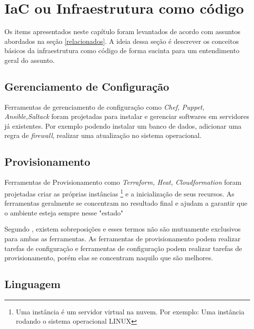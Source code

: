 \section{\esp IaC ou Infraestrutura como código} \label{IaC}

Os items apresentados neste capítulo foram levantados de acordo com assuntos abordados na seção \ref{relacionados}. A ideia dessa seção é descrever os conceitos básicos da infraestrutura como código de forma sucinta para um entendimento geral do assunto.  

\subsection{Gerenciamento de Configuração} 
Ferramentas de gerenciamento de configuração como \textit{Chef, Puppet, Ansible,Saltack} foram projetadas para instalar e gerenciar softwares em servidores já existentes. Por exemplo podendo instalar um banco de dados, adicionar uma regra de \textit{firewall}, realizar uma atualização no sistema operacional. 

\subsection{Provisionamento}

Ferramentas de Provisionamento como \textit{Terraform, Heat, Cloudformation} foram projetadas criar as próprias instâncias \footnote{Uma instância é um servidor virtual na nuvem. Por exemplo: Uma instância rodando o sistema operacional LINUX} e a inicialização de seus recursos. As ferramentas geralmente se concentram no resultado final e ajudam a garantir que o ambiente esteja sempre nesse "estado" 

Segundo , existem sobreposições e esses termos não são mutuamente exclusivos para ambas as ferramentas. As ferramentas de provisionamento podem realizar tarefas de configuração e ferramentas de configuração podem realizar tarefas de provisionamento, porém elas se concentram naquilo que são melhores. 


\subsection{Linguagem}

